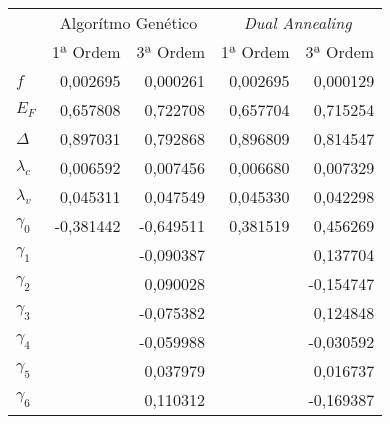 \begin{tabular}{lrrrr}
\toprule
{} & \multicolumn{2}{c}{Algorítmo Genético} & \multicolumn{2}{c}{\textit{Dual Annealing}} \\
{} &           1ª Ordem &  3ª Ordem &                1ª Ordem &  3ª Ordem \\
\midrule
$f$         &           0,002695 &  0,000261 &                0,002695 &  0,000129 \\
$E_F$       &           0,657808 &  0,722708 &                0,657704 &  0,715254 \\
$\Delta$    &           0,897031 &  0,792868 &                0,896809 &  0,814547 \\
$\lambda_c$ &           0,006592 &  0,007456 &                0,006680 &  0,007329 \\
$\lambda_v$ &           0,045311 &  0,047549 &                0,045330 &  0,042298 \\
$\gamma_0$  &          -0,381442 & -0,649511 &                0,381519 &  0,456269 \\
$\gamma_1$  &                    & -0,090387 &                         &  0,137704 \\
$\gamma_2$  &                    &  0,090028 &                         & -0,154747 \\
$\gamma_3$  &                    & -0,075382 &                         &  0,124848 \\
$\gamma_4$  &                    & -0,059988 &                         & -0,030592 \\
$\gamma_5$  &                    &  0,037979 &                         &  0,016737 \\
$\gamma_6$  &                    &  0,110312 &                         & -0,169387 \\
\bottomrule
\end{tabular}
